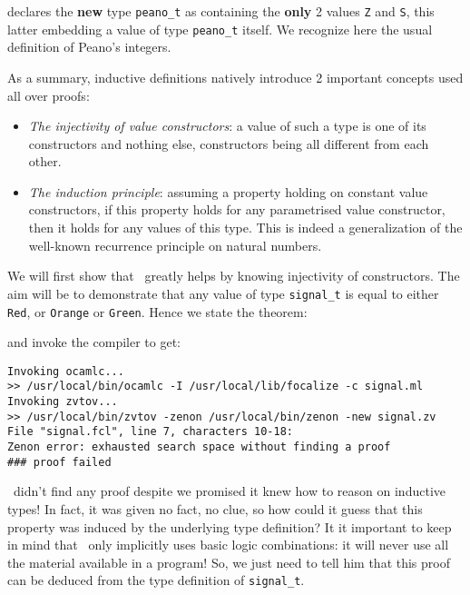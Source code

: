 \documentclass[11pt,a4paper,twoside,onecolumn,fullpage]{article}
\begin{document}
\noindent declares the {\bf new} type \lstinline"peano_t" as containing the
{\bf only} 2 values \lstinline"Z" and \lstinline"S", this latter
embedding a value of type \lstinline"peano_t" itself. We recognize
here the usual definition of Peano's integers.

\medskip
As a summary, inductive definitions natively introduce 2 important
concepts used all over proofs:
\begin{itemize}
\item {\em The injectivity of value constructors}: a value of such a type is
  one of its cons\-truc\-tors and nothing else, constructors being all
  different from each other.
\item {\em The induction principle}: assuming a property holding on constant
  value constructors, if this property holds for any parametrised
  value constructor, then it holds for any values of this type. This is
  indeed a generalization of the well-known recurrence principle on
  natural numbers.
\end{itemize}

\medskip
We will first show that \zenon\ greatly helps by knowing injectivity
of constructors. The aim will be to demonstrate that any value of type
\lstinline"signal_t" is equal to either \lstinline"Red", or \lstinline"Orange"
or \lstinline"Green". Hence we state the theorem:

{\scriptsize
}

\noindent and invoke the compiler to get:

{\scriptsize
\begin{verbatim}
Invoking ocamlc...
>> /usr/local/bin/ocamlc -I /usr/local/lib/focalize -c signal.ml
Invoking zvtov...
>> /usr/local/bin/zvtov -zenon /usr/local/bin/zenon -new signal.zv
File "signal.fcl", line 7, characters 10-18:
Zenon error: exhausted search space without finding a proof
### proof failed
\end{verbatim}}

\zenon\ didn't find any proof despite we promised it knew how to
reason on inductive types! In fact, it was given no fact, no clue, so
how could it guess that this property was induced by the underlying
type definition? It it important to keep in mind that \zenon\ only implicitly uses
basic logic combinations: it will never use all the material
available in a program! So, we just need to tell him that this proof
can be deduced from the type definition of \lstinline"signal_t".
\end{document}
